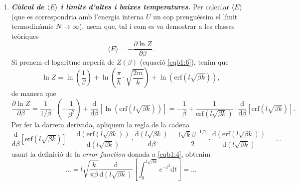 \documentclass[a4paper, 10pt]{article}
\begin{document}
\begin{enumerate}
Una forma alternativa de calcular aquesta funció de partició és usant que $Z$ és la transformada de Laplace de $\Omega$, és a dir
\begin{equation}
	Z = \int_{0}^{\infty}\mathrm{d}Ee^{-\beta E}\Omega(E,V,N),
\end{equation}
aprofitant que, a l'apartat anterior, hem calculat el nombre de microestats $\Omega$.
\\
	\item \textbf{\textit{Càlcul de $\langle E \rangle$ i límits d'altes i baixes temperatures.}}
Per calcular $\langle E \rangle$ (que es correspondria amb l'energia interna $U$ un cop prenguéssim el límit termodinàmic $N \rightarrow \infty$), usem que, tal i com es va demostrar a les classes teòriques
\begin{equation}
	\langle E \rangle = - \frac{\partial \ln Z}{\partial \beta}. \label{eqb2:1}
\end{equation}
Si prenem el logaritme neperià de $Z(\beta)$ (equació \eqref{eqb1:6}), tenim que
\begin{equation}
	\ln Z = \ln\left(\frac{1}{\beta}\right) + \ln\left(\frac{\pi}{h}\cdot \sqrt{\frac{2m}{k}}\right) + \ln(\mathrm{erf}(l\sqrt{\beta k})),\label{eqb2:2}
\end{equation}
de manera que
\begin{equation*}
	\frac{\partial \ln Z}{\partial \beta} = \frac{1}{1/\beta}\cdot \left(-\frac{1}{\beta^2}\right) + \frac{\mathrm{d}}{\mathrm{d} \beta}\left[\ln\left(\mathrm{erf}(l\sqrt{\beta k})\right)\right] = -\frac{1}{\beta} + \frac{1}{\mathrm{erf}(l\sqrt{\beta k})}\cdot \frac{\mathrm{d}}{\mathrm{d} \beta}\left[\mathrm{erf}(l\sqrt{\beta k})\right]. 
\end{equation*}
Per fer la darrera derivada, apliquem la regla de la cadena
\begin{equation*}
	\frac{\mathrm{d}}{\mathrm{d}\beta}\left[\mathrm{erf}(l\sqrt{\beta k})\right] = \frac{\mathrm{d}(\mathrm{erf}(l\sqrt{\beta k}))}{\mathrm{d}(l\sqrt{\beta k})}\cdot \frac{\mathrm{d}(l\sqrt{\beta k})}{\mathrm{d}\beta} = \frac{l\sqrt{k}\beta^{-1/2}}{2}\cdot \frac{\mathrm{d}(\mathrm{erf}(l\sqrt{\beta k}))}{\mathrm{d}(l\sqrt{\beta k})} = \ldots
\end{equation*}
usant la definició de la \textit{error function} donada a \eqref{eqb1:4}, obtenim
\begin{equation*}
	\ldots = l \sqrt{\frac{k}{\pi \beta}} \frac{\mathrm{d}}{\mathrm{d}(l\sqrt{\beta k})}\left[\int_0^{l\sqrt{\beta k}}e^{-t^2}\mathrm{d}t\right] = \ldots
\end{equation*}

\end{enumerate}
\end{document}
